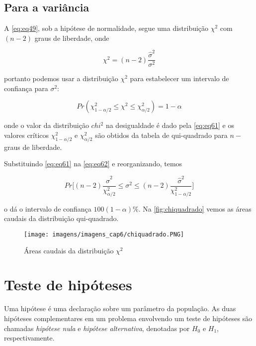 \subsection{Para a variância}

\noindent A \autoref{eq:eq49}, sob a hipótese de normalidade, segue uma distribuição $\chi^2$ com $(n-2)$ graus de liberdade, onde

\begin{equation}
    \label{eq:eq61}
    \chi^2 = (n-2)\dfrac{\hat{\sigma}^2}{\sigma^2}
\end{equation}


\noindent portanto podemos usar a distribuição $\chi^2$ para estabelecer um intervalo de confiança para $\sigma^2$:

\begin{equation}
    \label{eq:eq62}
    Pr(\chi^2_{1-\alpha/2} \leq \chi^2 \leq \chi^2_{\alpha/2}) = 1 - \alpha
\end{equation}

\noindent onde o valor da distribuição $chi^2$ na desigualdade é dado pela \autoref{eq:eq61} e os valores críticos $\chi^2_{1-\alpha/2}$ e $\chi^2_{\alpha/2}$ são obtidos da tabela de qui-quadrado para $n-$ graus de liberdade.

\noindent Substituindo \autoref{eq:eq61} na \autoref{eq:eq62} e reorganizando, temos

\begin{equation}
    \label{eq:eq63}
    Pr\bigg[(n-2)\dfrac{\hat{\sigma}^2}{\chi^2_{\alpha/2}} \leq \sigma^2 \leq   (n-2)\dfrac{\hat{\sigma}^2}{\chi^2_{1-\alpha/2}} \bigg]
\end{equation}

o dá o intervalo de confiança $100(1-\alpha)\%$. Na \autoref{fig:chiquadrado} vemos as áreas caudais da distribuição qui-quadrado.


\begin{figure}[H]
\centering
\caption{Áreas caudais da distribuição $\chi^2$}
\texttt{[image: imagens/imagens\_cap6/chiquadrado.PNG]}
\label{fig:chiquadrado}
\end{figure}

\section{Teste de hipóteses}

\noindent Uma hipótese é uma declaração sobre um parâmetro da população. As duas hipóteses complementares em um problema envolvendo um teste de hipóteses
são chamadas \textit{hipótese nula} e \textit{hipótese alternativa}, denotadas por $H_0$ e $H_1$, respectivamente.\\

